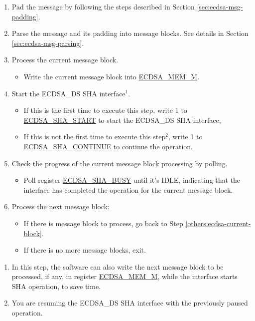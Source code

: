 \documentclass[main\_\_EN.tex]{subfiles}
\begin{document}
\begin{enumerate}
	\item Pad the message by following the steps described in Section \ref{sec:ecdsa-msg-padding}.
	\item Parse the message and its padding into message blocks. See details in Section \ref{sec:ecdsa-msg-parsing}.
	\item \label{others:ecdsa-current-block} Process the current message block.
	      \begin{itemize}
		      \item Write the current message block into \hyperref[tab:ecdsa-memory]{ECDSA\_MEM\_M}.
	      \end{itemize}
	\item Start the ECDSA\_DS SHA interface\hyperref[others:ecdsa-note-sha]{$^1$}.
	      \begin{itemize}
		      \item If this is the first time to execute this step, write 1 to \hyperref[fielddesc:ECDSASHASTART]{ECDSA\_SHA\_START} to start the ECDSA\_DS SHA interface;
		      \item If this is not the first time to execute this step\hyperref[others:ecdsa-note-sha]{$^2$}, write 1 to \hyperref[fielddesc:ECDSASHACONTINUE]{ECDSA\_SHA\_CONTINUE} to continue the operation.
	      \end{itemize}
	\item Check the progress of the current message block processing by polling.
	      \begin{itemize}
		      \item Poll register \hyperref[fielddesc:ECDSASHABUSY]{ECDSA\_SHA\_BUSY} until it's IDLE, indicating that the interface has completed the operation for the current message block.
	      \end{itemize}

	\item Process the next message block:
	      \begin{itemize}
		      \item If there is message block to process, go back to Step \ref{others:ecdsa-current-block}.
		      \item If there is no more message blocks, exit.
	      \end{itemize}

\end{enumerate}

\begin{tiplisting}\label{others:ecdsa-note-sha}
\vspace{-2.5em}
\begin{enumerate}
\item In this step, the software can also write the next message block to be processed, if any, in register \hyperref[tab:ecdsa-memory]{ECDSA\_MEM\_M}, while the interface starts SHA operation, to save time.
\item You are resuming the ECDSA\_DS SHA interface with the previously paused operation.
\end{enumerate}
\end{tiplisting}
\end{document}
